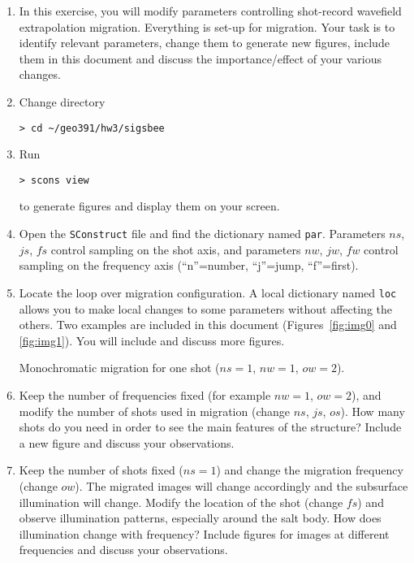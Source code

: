 \begin{enumerate}
\item
In this exercise, you will modify parameters controlling 
shot-record wavefield extrapolation migration.
Everything is set-up for migration. Your task is to
identify relevant parameters, change them to generate 
new figures, include them in this document and discuss
the importance/effect of your various changes.



\item Change directory 

\begin{verbatim}
> cd ~/geo391/hw3/sigsbee
\end{verbatim}
  \item Run
\begin{verbatim}
> scons view
\end{verbatim}
to generate figures and display them on your screen.  

\item
Open the \texttt{SConstruct} file and 
find the dictionary named \texttt{par}.
Parameters $ns$, $js$, $fs$ control sampling on the shot axis,
and parameters $nw$, $jw$, $fw$ control sampling on the 
frequency axis (``n''=number, ``j''=jump, ``f''=first).

\item
Locate the loop over migration configuration.
A local dictionary  named \texttt{loc} allows you to 
make local changes to some parameters without affecting
the others.
Two examples are included in this document
(Figures~\ref{fig:img0} and \ref{fig:img1}).
You will include and discuss more figures.

{Monochromatic migration for one shot 
($ns=1$, $nw=1$, $ow=2$).}


\item
Keep the number of frequencies fixed 
(for example $nw=1$, $ow=2$),
and modify the number of shots used in migration
(change $ns$, $js$, $os$).
How many shots do you need in order to see the main 
features of the structure?
Include a new figure and discuss your observations.



\item
Keep the number of shots fixed ($ns=1$) 
and change the migration frequency (change $ow$).
The migrated images will change accordingly and
the subsurface illumination will change.
Modify the location of the shot (change $fs$)
and observe illumination patterns, especially around
the salt body.
How does illumination change with frequency?
Include figures for images at different frequencies
and discuss your observations.


\end{enumerate}
